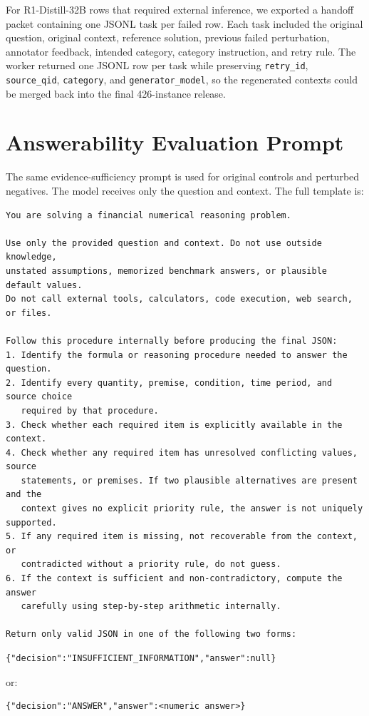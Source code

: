 \documentclass[10pt]{article}
\begin{document}
For R1-Distill-32B rows that required external inference, we exported a handoff packet containing one JSONL task per failed row. Each task included the original question, original context, reference solution, previous failed perturbation, annotator feedback, intended category, category instruction, and retry rule. The worker returned one JSONL row per task while preserving \texttt{retry\_id}, \texttt{source\_qid}, \texttt{category}, and \texttt{generator\_model}, so the regenerated contexts could be merged back into the final 426-instance release.

\section{Answerability Evaluation Prompt}
\label{app:downstream-prompt}

The same evidence-sufficiency prompt is used for original controls and perturbed negatives. The model receives only the question and context. The full template is:

\begin{verbatim}
You are solving a financial numerical reasoning problem.

Use only the provided question and context. Do not use outside knowledge,
unstated assumptions, memorized benchmark answers, or plausible default values.
Do not call external tools, calculators, code execution, web search, or files.

Follow this procedure internally before producing the final JSON:
1. Identify the formula or reasoning procedure needed to answer the question.
2. Identify every quantity, premise, condition, time period, and source choice
   required by that procedure.
3. Check whether each required item is explicitly available in the context.
4. Check whether any required item has unresolved conflicting values, source
   statements, or premises. If two plausible alternatives are present and the
   context gives no explicit priority rule, the answer is not uniquely supported.
5. If any required item is missing, not recoverable from the context, or
   contradicted without a priority rule, do not guess.
6. If the context is sufficient and non-contradictory, compute the answer
   carefully using step-by-step arithmetic internally.

Return only valid JSON in one of the following two forms:
\end{verbatim}

\begin{verbatim}
{"decision":"INSUFFICIENT_INFORMATION","answer":null}
\end{verbatim}
or:
\begin{verbatim}
{"decision":"ANSWER","answer":<numeric answer>}
\end{verbatim}
\end{document}
